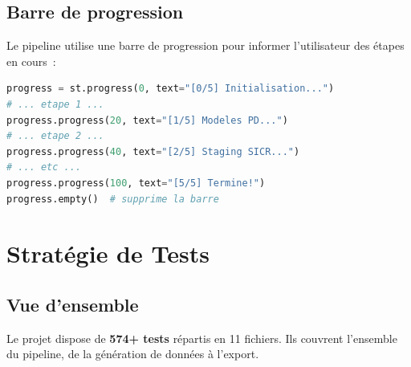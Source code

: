 \documentclass[12pt,a4paper]{article}
\begin{document}
\subsection{Barre de progression}

Le pipeline utilise une barre de progression pour informer l'utilisateur des \'etapes en cours~:

\begin{lstlisting}[language=Python]
progress = st.progress(0, text="[0/5] Initialisation...")
# ... etape 1 ...
progress.progress(20, text="[1/5] Modeles PD...")
# ... etape 2 ...
progress.progress(40, text="[2/5] Staging SICR...")
# ... etc ...
progress.progress(100, text="[5/5] Termine!")
progress.empty()  # supprime la barre
\end{lstlisting}


\section{Strat\'egie de Tests}
\label{sec:tests}

\subsection{Vue d'ensemble}

Le projet dispose de \textbf{574+ tests} r\'epartis en 11 fichiers. Ils couvrent l'ensemble du pipeline, de la g\'en\'eration de donn\'ees \`a l'export.
\end{document}
